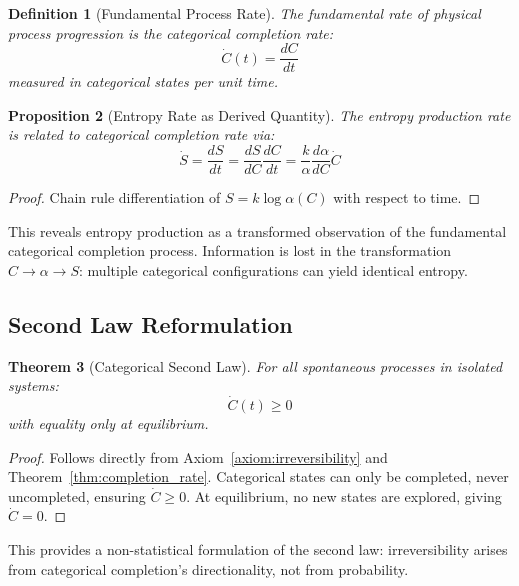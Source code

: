 \documentclass[12pt,a4paper]{article}
\newtheorem{theorem}{Theorem}[section]
\newtheorem{definition}[theorem]{Definition}
\newtheorem{proposition}[theorem]{Proposition}
\theoremstyle{remark}
\begin{document}
\begin{definition}[Fundamental Process Rate]
The fundamental rate of physical process progression is the categorical completion rate:
\begin{equation}
\dot{C}(t) = \frac{dC}{dt}
\label{eq:fundamental_rate}
\end{equation}
measured in categorical states per unit time.
\end{definition}

\begin{proposition}[Entropy Rate as Derived Quantity]
The entropy production rate is related to categorical completion rate via:
\begin{equation}
\dot{S} = \frac{dS}{dt} = \frac{dS}{dC} \frac{dC}{dt} = \frac{k}{\alpha} \frac{d\alpha}{dC} \dot{C}
\label{eq:entropy_rate}
\end{equation}
\end{proposition}

\begin{proof}
Chain rule differentiation of $S = k \log \alpha(C)$ with respect to time.
\end{proof}

This reveals entropy production as a transformed observation of the fundamental categorical completion process. Information is lost in the transformation $C \to \alpha \to S$: multiple categorical configurations can yield identical entropy.

\subsection{Second Law Reformulation}

\begin{theorem}[Categorical Second Law]
\label{thm:second_law}
For all spontaneous processes in isolated systems:
\begin{equation}
\dot{C}(t) \geq 0
\end{equation}
with equality only at equilibrium.
\end{theorem}

\begin{proof}
Follows directly from Axiom~\ref{axiom:irreversibility} and Theorem~\ref{thm:completion_rate}. Categorical states can only be completed, never uncompleted, ensuring $\dot{C} \geq 0$. At equilibrium, no new states are explored, giving $\dot{C} = 0$.
\end{proof}

This provides a non-statistical formulation of the second law: irreversibility arises from categorical completion's directionality, not from probability.
\end{document}
